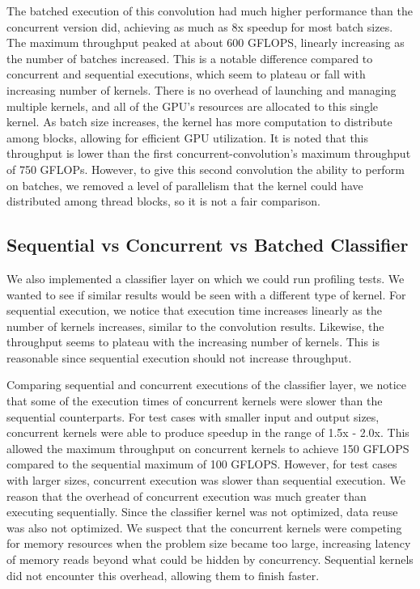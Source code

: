 \documentclass[sigconf]{acmart}
\begin{document}
The batched execution of this convolution had much higher performance than the concurrent version did, achieving as much as 8x speedup for most batch sizes. The maximum throughput peaked at about 600 GFLOPS, linearly increasing as the number of batches increased. This is a notable difference compared to concurrent and sequential executions, which seem to plateau or fall with increasing number of kernels. There is no overhead of launching and managing multiple kernels, and all of the GPU’s resources are allocated to this single kernel. As batch size increases, the kernel has more computation to distribute among blocks, allowing for efficient GPU utilization. It is noted that this throughput is lower than the first concurrent-convolution’s maximum throughput of 750 GFLOPs. However, to give this second convolution the ability to perform on batches, we removed a level of parallelism that the kernel could have distributed among thread blocks, so it is not a fair comparison.

\subsection{Sequential vs Concurrent vs Batched Classifier}

We also implemented a classifier layer on which we could run profiling tests. We wanted to see if similar results would be seen with a different type of kernel. For sequential execution, we notice that execution time increases linearly as the number of kernels increases, similar to the convolution results. Likewise, the throughput seems to plateau with the increasing number of kernels. This is reasonable since sequential execution should not increase throughput.

Comparing sequential and concurrent executions of the classifier layer, we notice that some of the execution times of concurrent kernels were slower than the sequential counterparts. For test cases with smaller input and output sizes, concurrent kernels were able to produce speedup in the range of 1.5x - 2.0x. This allowed the maximum throughput on concurrent kernels to achieve 150 GFLOPS compared to the sequential maximum of 100 GFLOPS. However, for test cases with larger sizes, concurrent execution was slower than sequential execution. We reason that the overhead of concurrent execution was much greater than executing sequentially. Since the classifier kernel was not optimized, data reuse was also not optimized. We suspect that the concurrent kernels were competing for memory resources when the problem size became too large, increasing latency of memory reads beyond what could be hidden by concurrency. Sequential kernels did not encounter this overhead, allowing them to finish faster. 
\end{document}

